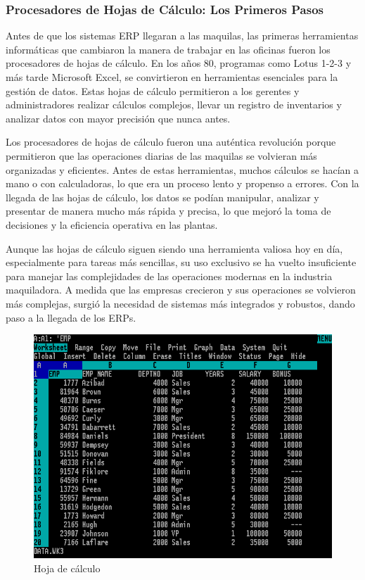 \documentclass[
  10pt,
  letterpaper,
]{book}
\begin{document}
\subsubsection{Procesadores de Hojas de Cálculo: Los Primeros
Pasos}\label{procesadores-de-hojas-de-cuxe1lculo-los-primeros-pasos}

Antes de que los sistemas ERP llegaran a las maquilas, las primeras
herramientas informáticas que cambiaron la manera de trabajar en las
oficinas fueron los procesadores de hojas de cálculo. En los años 80,
programas como Lotus 1-2-3 y más tarde Microsoft Excel, se convirtieron
en herramientas esenciales para la gestión de datos. Estas hojas de
cálculo permitieron a los gerentes y administradores realizar cálculos
complejos, llevar un registro de inventarios y analizar datos con mayor
precisión que nunca antes.

Los procesadores de hojas de cálculo fueron una auténtica revolución
porque permitieron que las operaciones diarias de las maquilas se
volvieran más organizadas y eficientes. Antes de estas herramientas,
muchos cálculos se hacían a mano o con calculadoras, lo que era un
proceso lento y propenso a errores. Con la llegada de las hojas de
cálculo, los datos se podían manipular, analizar y presentar de manera
mucho más rápida y precisa, lo que mejoró la toma de decisiones y la
eficiencia operativa en las plantas.

Aunque las hojas de cálculo siguen siendo una herramienta valiosa hoy en
día, especialmente para tareas más sencillas, su uso exclusivo se ha
vuelto insuficiente para manejar las complejidades de las operaciones
modernas en la industria maquiladora. A medida que las empresas
crecieron y sus operaciones se volvieron más complejas, surgió la
necesidad de sistemas más integrados y robustos, dando paso a la llegada
de los ERPs.

\begin{figure}[H]

{\centering \includegraphics{Img/Lotus.png}

}

\caption{Hoja de cálculo}

\end{figure}%
\end{document}
